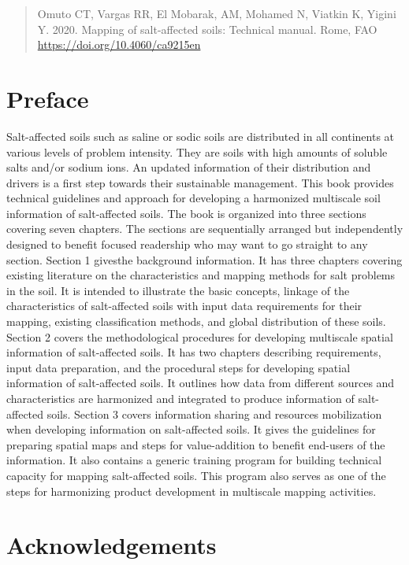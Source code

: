 \documentclass[
  10pt,
  b5paper,
]{book}
\begin{document}
\begin{quote}
Omuto CT, Vargas RR, El Mobarak, AM, Mohamed N, Viatkin K, Yigini Y. 2020. Mapping of salt-affected soils: Technical manual. Rome, FAO
\url{https://doi.org/10.4060/ca9215en}
\end{quote}

\hypertarget{preface}{%
\chapter*{Preface}\label{preface}}

Salt-affected soils such as saline or sodic soils are distributed in all continents at various levels of problem intensity.
They are soils with high amounts of soluble salts and/or sodium ions. An updated information of their distribution
and drivers is a first step towards their sustainable management. This book provides technical guidelines and
approach for developing a harmonized multiscale soil information of salt-affected soils. The book is organized into
three sections covering seven chapters. The sections are sequentially arranged but independently designed to
benefit focused readership who may want to go straight to any section. Section 1 givesthe background information.
It has three chapters covering existing literature on the characteristics and mapping methods for salt problems in
the soil. It is intended to illustrate the basic concepts, linkage of the characteristics of salt-affected soils with input
data requirements for their mapping, existing classification methods, and global distribution of these soils. Section
2 covers the methodological procedures for developing multiscale spatial information of salt-affected soils. It has
two chapters describing requirements, input data preparation, and the procedural steps for developing spatial
information of salt-affected soils. It outlines how data from different sources and characteristics are harmonized
and integrated to produce information of salt-affected soils. Section 3 covers information sharing and resources
mobilization when developing information on salt-affected soils. It gives the guidelines for preparing spatial maps
and steps for value-addition to benefit end-users of the information. It also contains a generic training program for
building technical capacity for mapping salt-affected soils. This program also serves as one of the steps for
harmonizing product development in multiscale mapping activities.

\hypertarget{acknowledgements}{%
\chapter*{Acknowledgements}\label{acknowledgements}}
\end{document}
